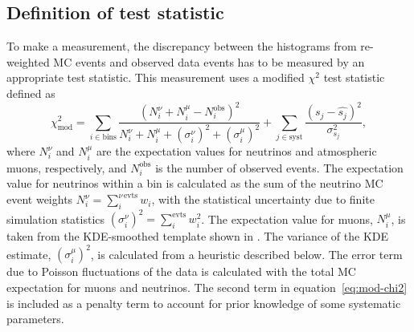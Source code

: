 \subsection{Definition of test statistic}
\label{sec:test-statistic}

To make a measurement, the discrepancy between the histograms from re-weighted MC events and observed data events has to be measured by an appropriate test statistic. This measurement uses a modified $\chi^2$ test statistic defined as
\begin{equation}
\chi^2_{\mathrm{mod}} = \sum_{i \in \mathrm{bins}}^{}\frac{(N^{\nu}_i + N^{\mu}_i - N^{\mathrm{obs}}_i)^2}{N^{\nu}_i + N^{\mu}_i + (\sigma^{\nu}_i)^2 + (\sigma^{\mu}_i)^2} + \sum_{j \in \mathrm{syst}}^{}\frac{(s_j - \hat{s_j})^2}{\sigma^2_{s_j}},
\label{eq:mod-chi2}
\end{equation}
\noindent where $N^{\nu}_i$ and $N^{\mu}_i$ are the expectation values for neutrinos and atmospheric muons, respectively, and $N^{\mathrm{obs}}_i$ is the number of observed events. The expectation value for neutrinos within a bin is calculated as the sum of the neutrino MC event weights $N^{\nu}_i = \sum_{i}^{\nu\,\mathrm{evts}} w_i$, with the statistical uncertainty due to finite simulation statistics $(\sigma^{\nu}_i)^2 = \sum_{i}^{\mathrm{evts}} w_i^2$. The expectation value for muons, $N^{\mu}_i$, is taken from the KDE-smoothed template shown in . The variance of the KDE estimate, $(\sigma^{\mu}_i)^2$, is calculated from a heuristic described below. The error term due to Poisson fluctuations of the data is calculated with the total MC expectation for muons and neutrinos. The second term in equation~\ref{eq:mod-chi2} is included as a penalty term to account for prior knowledge of some systematic parameters. 

